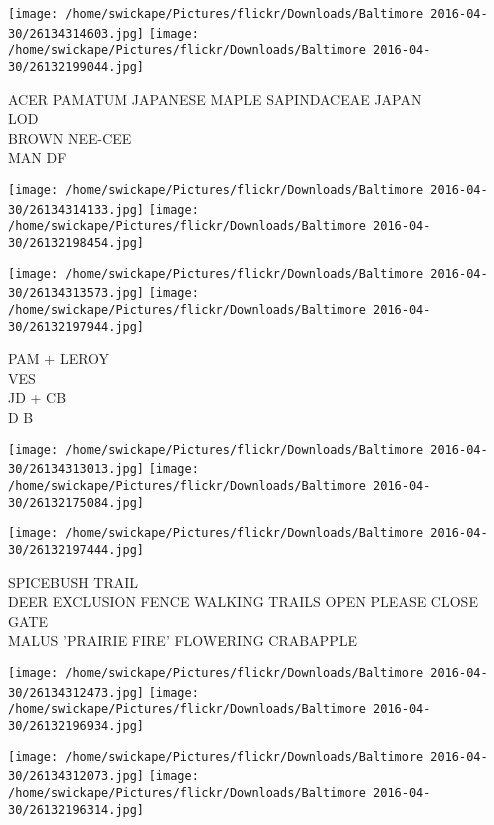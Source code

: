 \documentclass[10pt,letterpaper]{article}
\begin{document}
\texttt{[image: /home/swickape/Pictures/flickr/Downloads/Baltimore 2016-04-30/26134314603.jpg]}
\texttt{[image: /home/swickape/Pictures/flickr/Downloads/Baltimore 2016-04-30/26132199044.jpg]}

ACER PAMATUM JAPANESE MAPLE SAPINDACEAE JAPAN\\
LOD\\
BROWN NEE{-}CEE\\
MAN DF\\
\pagebreak

\texttt{[image: /home/swickape/Pictures/flickr/Downloads/Baltimore 2016-04-30/26134314133.jpg]}
\texttt{[image: /home/swickape/Pictures/flickr/Downloads/Baltimore 2016-04-30/26132198454.jpg]}

\texttt{[image: /home/swickape/Pictures/flickr/Downloads/Baltimore 2016-04-30/26134313573.jpg]}
\texttt{[image: /home/swickape/Pictures/flickr/Downloads/Baltimore 2016-04-30/26132197944.jpg]}

PAM + LEROY\\
VES\\
JD + CB\\
D B\\
\pagebreak

\texttt{[image: /home/swickape/Pictures/flickr/Downloads/Baltimore 2016-04-30/26134313013.jpg]}
\texttt{[image: /home/swickape/Pictures/flickr/Downloads/Baltimore 2016-04-30/26132175084.jpg]}

\vspace{0.25in}
\texttt{[image: /home/swickape/Pictures/flickr/Downloads/Baltimore 2016-04-30/26132197444.jpg]}

SPICEBUSH TRAIL\\
DEER EXCLUSION FENCE WALKING TRAILS OPEN PLEASE CLOSE GATE\\
MALUS 'PRAIRIE FIRE' FLOWERING CRABAPPLE\\
\pagebreak

\texttt{[image: /home/swickape/Pictures/flickr/Downloads/Baltimore 2016-04-30/26134312473.jpg]}
\texttt{[image: /home/swickape/Pictures/flickr/Downloads/Baltimore 2016-04-30/26132196934.jpg]}

\texttt{[image: /home/swickape/Pictures/flickr/Downloads/Baltimore 2016-04-30/26134312073.jpg]}
\texttt{[image: /home/swickape/Pictures/flickr/Downloads/Baltimore 2016-04-30/26132196314.jpg]}
\end{document}
